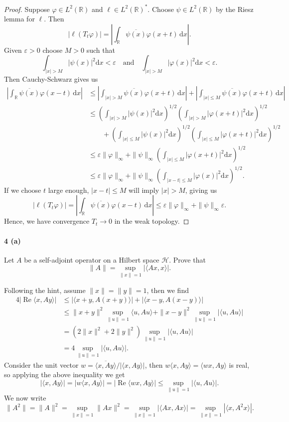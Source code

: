 \documentclass[12pt]{article}
\newlength{\myparskip}
\newenvironment{fullbox}{\begin{lrbox}{\savefullbox}\begin{minipage}{\dimexpr\textwidth-2\fboxsep\relax}\setlength{\parskip}{\myparskip}}{\end{minipage}\end{lrbox}\framebox[\textwidth]{\usebox{\savefullbox}}}
\newenvironment{pbox}[1][]{\begin{fullbox}\def\temp{#1}\ifx\temp\empty\else\paragraph{#1}\phantom{}\fi}{\end{fullbox}}
\theoremstyle{definition}
\newcommand{\isp}[1]{\quad\text{#1}\quad}
\newcommand{\R}{\mathbb{R}}
\newcommand{\eps}{\varepsilon}
\renewcommand{\phi}{\varphi}
\newcommand{\<}{\langle}
\renewcommand{\>}{\rangle}
\newcommand{\dd}{\mathrm{d}}
\newcommand{\HH}{\mathcal{H}}
\newcommand{\conj}{\overline}
\begin{document}
\begin{proof}
    Suppose $\phi \in L^2(\R)$ and $\ell \in L^2(\R)^*$.
    Choose $\psi \in L^2(\R)$ by the Riesz lemma for $\ell$.
    Then
    \[
        |\ell(T_t\phi)| = \left|\int_\R \conj{\psi(x)}\phi(x + t) \,\dd{x}\right|.
    \]
    Given $\eps > 0$ choose $M > 0$ such that
    \[
        \int_{|x|>M} |\psi(x)|^2 \dd{x} < \eps
        \isp{and}
        \int_{|x|>M} |\phi(x)|^2 \dd{x} < \eps.
    \]
    Then Cauchy-Schwarz gives us
    \begin{align*}
        \left|\int_\R \conj{\psi(x)}\phi(x - t) \,\dd{x}\right|
            &\leq \left|\int_{|x|>M} \conj{\psi(x)}\phi(x + t) \,\dd{x}\right| + \left|\int_{|x|\leq M} \conj{\psi(x)}\phi(x + t) \,\dd{x}\right| \\
            &\leq \left(\int_{|x|>M} |\psi(x)|^2\dd{x}\right)^{1/2}
                \left(\int_{|x|>M} |\phi(x + t)|^2\dd{x}\right)^{1/2} \\
            &\qquad + \left(\int_{|x|\leq M} |\psi(x)|^2\dd{x}\right)^{1/2}
                \left(\int_{|x|\leq M} |\phi(x + t)|^2\dd{x}\right)^{1/2} \\
            &\leq \eps \|\phi\|_\infty + \|\psi\|_\infty \left(\int_{|x|\leq M} |\phi(x + t)|^2\dd{x}\right)^{1/2} \\
            &\leq \eps \|\phi\|_\infty + \|\psi\|_\infty \left(\int_{|x-t|\leq M} |\phi(x)|^2\dd{x}\right)^{1/2}.
    \end{align*}
    If we choose $t$ large enough, $|x - t| \leq M$ will imply $|x| > M$, giving us
    \[
        |\ell(T_t\phi)|
            = \left|\int_\R \conj{\psi(x)}\phi(x - t) \,\dd{x}\right|
            \leq \eps \|\phi\|_\infty + \|\psi\|_\infty \eps.
    \]
    Hence, we have convergence $T_t \to 0$ in the weak topology.
\end{proof}



\newpage

\begin{pbox}[4 (a)]
    Let $A$ be a self-adjoint operator on a Hilbert space $\HH$.
    Prove that 
    \[
        \|A\| = \sup_{\|x\| = 1} |\<Ax, x\>|.
    \]
\end{pbox}


Following the hint, assume $\|x\| = \|y\| = 1$, then we find
\begin{align*}
    4|\operatorname{Re}\<x, Ay\>|
        &\leq |\<x + y, A(x + y)\>| + |\<x - y, A(x - y)\>| \\
        &\leq \|x + y\|^2 \sup_{\|u\| = 1} \<u, Au\> + \|x - y\|^2 \sup_{\|u\| = 1} |\<u, Au\>| \\
        &= (2\|x\|^2 + 2\|y\|^2) \sup_{\|u\| = 1} |\<u, Au\>| \\
        &= 4 \sup_{\|u\| = 1} |\<u, Au\>|.
\end{align*}
Consider the unit vector $w = \conj{\<x, Ay\>}/|\<x, Ay\>|$, then $w\<x, Ay\> = \<wx, Ay\>$ is real, so applying the above inequality we get
\[
    |\<x, Ay\>|
        = |w\<x, Ay\>|
        = |\operatorname{Re}\<wx, Ay\>|
        \leq \sup_{\|u\| = 1} |\<u, Au\>|.
\]
We now write
\[
    \|A^2\|
        = \|A\|^2
        = \sup_{\|x\|=1} \|Ax\|^2
        = \sup_{\|x\|=1} |\<Ax, Ax\>|
        = \sup_{\|x\|=1} |\<x, A^2x\>|.
\]
\end{document}
